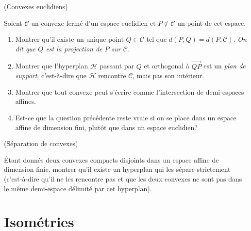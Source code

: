 \documentclass[a4paper,12pt,reqno]{amsart}
\begin{document}
\begin{exo} (Convexes euclidiens)

    Soient $\mathcal{C}$ un convexe fermé d'un espace euclidien et $P \notin \mathcal{C}$ un point de cet espace.
    \begin{enumerate}
       \item Montrer qu'il existe un unique point $Q \in \mathcal{C}$ tel que $d(P,Q) = d(P,\mathcal{C})$. \newline
       \emph{On dit que $Q$ est la projection de $P$ sur $\mathcal{C}$.}

       \item Montrer que l'hyperplan $\mathcal{H}$ passant par $Q$ et orthogonal à $\overrightarrow{QP}$ est un \emph{plan de support}, c'est-à-dire que $\mathcal{H}$ rencontre $\mathcal{C}$, mais pas son intérieur.

       \item Montrer que tout convexe peut s'écrire comme l'intersection de demi-espaces affines.

       \item Est-ce que la question précédente reste vraie si on se place dans un espace affine de dimension fini, plutôt que dans un espace euclidien?
     \end{enumerate}
\end{exo}

\begin{exo} (Séparation de convexes)

  Étant donnés deux convexes compacts disjoints dans un espace affine de dimension finie, montrer qu'il existe un hyperplan qui les sépare strictement (c'est-à-dire qu'il ne les rencontre pas et que les deux convexes ne sont pas dans le même demi-espace délimité par cet hyperplan).
\end{exo}


\section{Isométries}
\end{document}
